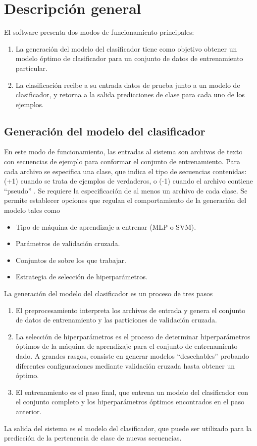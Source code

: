 %
%
%
\section{Descripción general}
%
El software presenta dos modos de funcionamiento principales:
%
\begin{enumerate}
\item
  La generación del modelo del clasificador tiene como objetivo
  obtener un modelo óptimo de clasificador para un conjunto de datos
  de entrenamiento particular.
\item
  La clasificación recibe a su entrada datos de prueba junto a un
  modelo de clasificador, y retorna a la salida predicciones de clase
  para cada uno de los ejemplos.
\end{enumerate}
%
%
%
\subsection{Generación del modelo del clasificador}
%
En este modo de funcionamiento, las entradas al sistema son archivos
de texto con secuencias de ejemplo para conformar el conjunto de
entrenamiento. Para cada archivo se especifica una clase, que indica
el tipo de secuencias contenidas:  (+1) cuando se trata de
ejemplos de  verdaderos, o  (-1) cuando el
archivo contiene ``pseudo'' . Se requiere la
especificación de al menos un archivo de cada clase.
Se permite establecer opciones que regulan el comportamiento
de la generación del modelo tales como
%
\begin{itemize}
\item Tipo de máquina de aprendizaje a entrenar (MLP o SVM).
\item Parámetros de validación cruzada.
\item Conjuntos de  sobre los que trabajar.
\item Estrategia de selección de hiperparámetros.
\end{itemize}
%

La generación del modelo del clasificador es un proceso de tres pasos
%
\begin{enumerate}
\item El preprocesamiento interpreta los archivos de entrada y
  genera el conjunto de datos de entrenamiento y las particiones de
  validación cruzada.
\item La selección de hiperparámetros es el proceso de determinar
  hiperparámetros óptimos de la máquina de aprendizaje para
  el conjunto de entrenamiento dado. A grandes rasgos, consiste en
  generar modelos ``desechables'' probando diferentes configuraciones
  mediante validación cruzada hasta obtener un óptimo.
\item El entrenamiento es el paso final, que entrena un modelo del
  clasificador con el conjunto completo y los hiperparámetros
  óptimos encontrados en el paso anterior.
\end{enumerate}
%
La salida del sistema es el modelo del clasificador, que
puede ser utilizado para la predicción de la pertenencia de clase de
nuevas secuencias.
%
%
